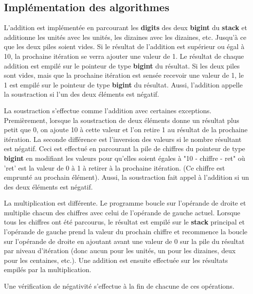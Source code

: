 \documentclass[]{report}
\begin{document}
	\begin{normalsize}
		\section*{\LARGE Implémentation des algorithmes}\vspace{4mm}
		L'addition est implémentée en parcourant les \textbf{digits} des deux \textbf{bigint} du \textbf{stack} et additionne les unités avec les unités, les dizaines avec les dizaines, etc. Jusqu'à ce que les deux piles soient vides. Si le résultat de l'addition est supérieur ou égal à 10, la prochaine itération se verra ajouter une valeur de 1. Le résultat de chaque addition est empilé sur le pointeur de type \textbf{bigint} du résultat. Si les deux piles sont vides, mais que la prochaine itération est sensée recevoir une valeur de 1, le 1 est empilé sur le pointeur de type \textbf{bigint} du résultat. Aussi, l'addition appelle la soustraction si l'un des deux éléments est négatif.
		\vspace{4mm}
		
		\par La soustraction s'effectue comme l'addition avec certaines exceptions. Premièrement, lorsque la soustraction de deux éléments donne un résultat plus petit que 0, on ajoute 10 à cette valeur et l'on retire 1 au résultat de la prochaine itération. La seconde différence est l'inversion des valeurs si le nombre résultant est négatif. Ceci est effectué en parcourant la pile de chiffres du pointeur de type \textbf{bigint} en modifiant les valeurs pour qu'elles soient égales à "10 - chiffre - ret" où 'ret' est la valeur de 0 à 1 à retirer à la prochaine itération. (Ce chiffre est emprunté au prochain élément). Aussi, la soustraction fait appel à l'addition si un des deux éléments est négatif.\vspace{4mm}
		
		\par La multiplication est différente. Le programme boucle sur l'opérande de droite et multiplie chacun des chiffres avec celui de l'opérande de gauche actuel. Lorsque tous les chiffres ont été parcourus, le résultat est empilé sur le \textbf{stack} principal et l'opérande de gauche prend la valeur du prochain chiffre et recommence la boucle sur l'opérande de droite en ajoutant avant une valeur de 0 sur la pile du résultat par niveau d'itération (donc aucun pour les unités, un pour les dizaines, deux pour les centaines, etc.). Une addition est ensuite effectuée sur les résultats empilés par la multiplication. \vspace{4mm}
		
		\par Une vérification de négativité s'effectue à la fin de chacune de ces opérations.
		\vspace{4mm}
	\end{normalsize}
\end{document}
